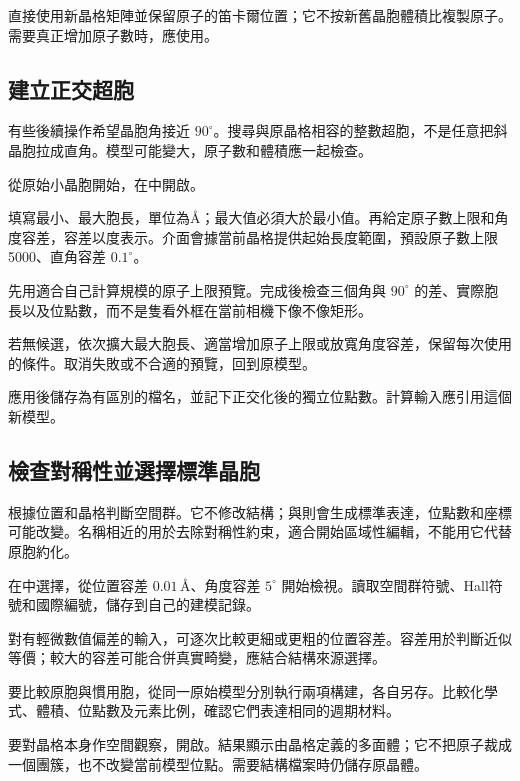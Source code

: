 直接使用新晶格矩陣並保留原子的笛卡爾位置；它不按新舊晶胞體積比複製原子。需要真正增加原子數時，應使用。



\subsection{建立正交超胞}\label{sec:orthogonal-cell-reference}

有些後續操作希望晶胞角接近 $90^\circ$。搜尋與原晶格相容的整數超胞，不是任意把斜晶胞拉成直角。模型可能變大，原子數和體積應一起檢查。

\begin{steps}
  \item 從原始小晶胞開始，在中開啟。
  \item 填寫最小、最大胞長，單位為\AA；最大值必須大於最小值。再給定原子數上限和角度容差，容差以度表示。介面會據當前晶格提供起始長度範圍，預設原子數上限5000、直角容差 $0.1^\circ$。
  \item 先用適合自己計算規模的原子上限預覽。完成後檢查三個角與 $90^\circ$ 的差、實際胞長以及位點數，而不是隻看外框在當前相機下像不像矩形。
  \item 若無候選，依次擴大最大胞長、適當增加原子上限或放寬角度容差，保留每次使用的條件。取消失敗或不合適的預覽，回到原模型。
  \item 應用後儲存為有區別的檔名，並記下正交化後的獨立位點數。計算輸入應引用這個新模型。
\end{steps}

\subsection{檢查對稱性並選擇標準晶胞}\label{sec:symmetry-reference}

根據位置和晶格判斷空間群。它不修改結構；與則會生成標準表達，位點數和座標可能改變。名稱相近的用於去除對稱性約束，適合開始區域性編輯，不能用它代替原胞約化。

\begin{steps}
  \item 在中選擇，從位置容差 $0.01\,\text{\AA}$、角度容差 $5^\circ$ 開始檢視。讀取空間群符號、Hall符號和國際編號，儲存到自己的建模記錄。
  \item 對有輕微數值偏差的輸入，可逐次比較更細或更粗的位置容差。容差用於判斷近似等價；較大的容差可能合併真實畸變，應結合結構來源選擇。
  \item 要比較原胞與慣用胞，從同一原始模型分別執行兩項構建，各自另存。比較化學式、體積、位點數及元素比例，確認它們表達相同的週期材料。
  \item 要對晶格本身作空間觀察，開啟。結果顯示由晶格定義的多面體；它不把原子裁成一個團簇，也不改變當前模型位點。需要結構檔案時仍儲存原晶體。
\end{steps}


